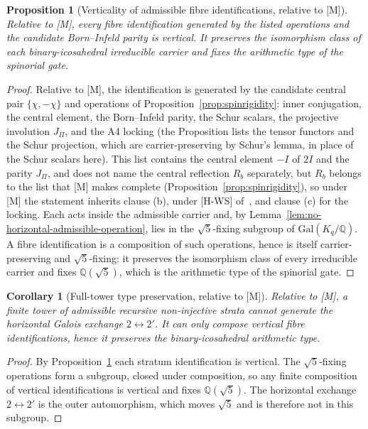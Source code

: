 \documentclass[11pt]{article}
\newtheorem{corollary}{Corollary}
\newtheorem{proposition}{Proposition}
\theoremstyle{definition}
\theoremstyle{remark}
\newcommand{\Gal}{\mathrm{Gal}}
\begin{document}
    \begin{proposition}[Verticality of admissible fibre identifications, relative to {[M]}]
      \label{prop:verticality-admissible-identifications}
      Relative to [M], every fibre identification generated by the listed operations and the candidate Born--Infeld parity is vertical.
      It preserves the isomorphism class of each binary-icosahedral irreducible carrier and fixes the arithmetic type
      of the spinorial gate.
    \end{proposition}

    \begin{proof}
      Relative to [M], the identification is generated by the candidate central pair $\{\chi,-\chi\}$ and
      operations of Proposition~\ref{prop:spinrigidity}: inner conjugation, the central element, the
      Born--Infeld parity, the Schur scalars, the projective involution $J_\Pi$, and the A4 locking (the Proposition
      lists the tensor functors and the Schur projection, which are carrier-preserving by Schur's lemma, in place of
      the Schur scalars here).
      This list contains the central element $-I$ of $2I$ and the parity $J_\Pi$, and does not name the central
      reflection $R_b$ separately, but $R_b$ belongs to the list that [M] makes complete (Proposition~\ref{prop:spinrigidity}),
      so under [M] the statement inherits clause (b), under [H-WS] of~\cite{Beau2026q11of}, and clause (c) for the
      locking.
      Each acts inside the admissible carrier and, by Lemma~\ref{lem:no-horizontal-admissible-operation}, lies in the
      $\sqrt{5}$-fixing subgroup of $\Gal(K_q/\mathbb{Q})$.
      A fibre identification is a composition of such operations, hence is itself carrier-preserving and
      $\sqrt{5}$-fixing: it preserves the isomorphism class of every irreducible carrier and fixes
      $\mathbb{Q}(\sqrt{5})$, which is the arithmetic type of the spinorial gate.
    \end{proof}

    \begin{corollary}[Full-tower type preservation, relative to {[M]}]
      \label{cor:full-tower-type-preservation}
      Relative to [M], a finite tower of admissible recursive non-injective strata cannot generate the horizontal Galois
      exchange $2\leftrightarrow2'$.
      It can only compose vertical fibre identifications, hence it preserves the binary-icosahedral arithmetic type.
    \end{corollary}

    \begin{proof}
      By Proposition~\ref{prop:verticality-admissible-identifications} each stratum identification is vertical.
      The $\sqrt{5}$-fixing operations form a subgroup, closed under composition, so any finite composition of vertical
      identifications is vertical and fixes $\mathbb{Q}(\sqrt{5})$.
      The horizontal exchange $2\leftrightarrow2'$ is the outer automorphism, which moves $\sqrt{5}$ and is therefore
      not in this subgroup.
    \end{proof}
\end{document}
